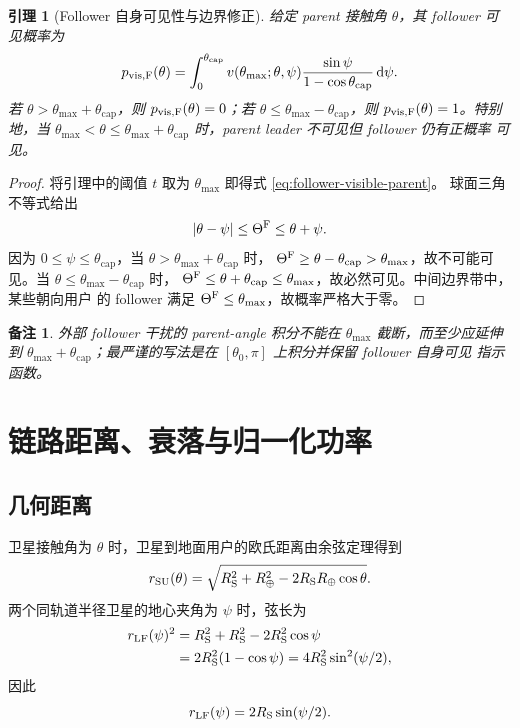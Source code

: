 \documentclass[UTF8,a4paper,11pt]{ctexart}
\newtheorem{lemma}{引理}[section]
\newtheorem{remark}{备注}[section]
\newcommand{\dd}{\,\mathrm d}
\newcommand{\Rearth}{R_{\oplus}}
\newcommand{\Rsat}{R_{\mathrm S}}
\newcommand{\thetam}{\theta_{\max}}
\newcommand{\thetac}{\theta_{\mathrm{cap}}}
\begin{document}
\begin{lemma}[Follower 自身可见性与边界修正]
\label{lem:follower-visibility}
给定 parent 接触角 $\theta$，其 follower 可见概率为
\begin{equation}
 p_{\rm vis,F}(\theta)
 =
 \int_0^{\thetac}
 v(\thetam;\theta,\psi)
 \frac{\sin\psi}{1-\cos\thetac}\dd\psi.
 \label{eq:follower-visible-parent}
\end{equation}
若 $\theta>\thetam+\thetac$，则 $p_{\rm vis,F}(\theta)=0$；若
$\theta\leq\thetam-\thetac$，则 $p_{\rm vis,F}(\theta)=1$。特别地，当
$\thetam<\theta\leq\thetam+\thetac$ 时，parent leader 不可见但 follower 仍有正概率
可见。
\end{lemma}

\begin{proof}
将引理中的阈值 $t$ 取为 $\thetam$ 即得式 \eqref{eq:follower-visible-parent}。
球面三角不等式给出
\begin{equation}
 |\theta-\psi|\leq\Theta^{\rm F}\leq\theta+\psi.
\end{equation}
因为 $0\leq\psi\leq\thetac$，当 $\theta>\thetam+\thetac$ 时，
$\Theta^{\rm F}\geq\theta-\thetac>\thetam$，故不可能可见。当
$\theta\leq\thetam-\thetac$ 时，
$\Theta^{\rm F}\leq\theta+\thetac\leq\thetam$，故必然可见。中间边界带中，某些朝向用户
的 follower 满足 $\Theta^{\rm F}\leq\thetam$，故概率严格大于零。
\end{proof}

\begin{remark}
外部 follower 干扰的 parent-angle 积分不能在 $\thetam$ 截断，而至少应延伸到
$\thetam+\thetac$；最严谨的写法是在 $[\theta_0,\pi]$ 上积分并保留 follower 自身可见
指示函数。
\end{remark}

\section{链路距离、衰落与归一化功率}

\subsection{几何距离}

卫星接触角为 $\theta$ 时，卫星到地面用户的欧氏距离由余弦定理得到
\begin{equation}
 r_{\rm SU}(\theta)
 =
 \sqrt{\Rsat^2+\Rearth^2-2\Rsat\Rearth\cos\theta}.
 \label{eq:su-distance}
\end{equation}
两个同轨道半径卫星的地心夹角为 $\psi$ 时，弦长为
\begin{equation}
\begin{split}
 r_{\rm LF}(\psi)^2
 &=\Rsat^2+\Rsat^2-2\Rsat^2\cos\psi\\
 &=2\Rsat^2(1-\cos\psi)
 =4\Rsat^2\sin^2(\psi/2),
\end{split}
\end{equation}
因此
\begin{equation}
 r_{\rm LF}(\psi)=2\Rsat\sin(\psi/2).
 \label{eq:lf-distance}
\end{equation}
\end{document}
